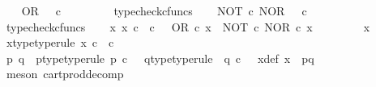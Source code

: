 \begin{isabellebody}
\ \ \isamarkupfalse%
\ {\isachardoublequoteopen}OR\ {\isacharcolon}{\kern0pt}\ {\isasymOmega}\ {\isasymtimes}\isactrlsub c\ {\isasymOmega}\ {\isasymrightarrow}\ {\isasymOmega}{\isachardoublequoteclose}\isanewline
\ \ \ \ \isamarkupfalse%
\ typecheck{\isacharunderscore}{\kern0pt}cfuncs\isanewline
\ \ \isamarkupfalse%
\ {\isachardoublequoteopen}NOT\ {\isasymcirc}\isactrlsub c\ NOR\ {\isacharcolon}{\kern0pt}\ {\isasymOmega}\ {\isasymtimes}\isactrlsub c\ {\isasymOmega}\ {\isasymrightarrow}\ {\isasymOmega}{\isachardoublequoteclose}\isanewline
\ \ \ \ \isamarkupfalse%
\ typecheck{\isacharunderscore}{\kern0pt}cfuncs\isanewline
\ \ \isamarkupfalse%
\ {\isachardoublequoteopen}{\isasymAnd}x{\isachardot}{\kern0pt}\ x\ {\isasymin}\isactrlsub c\ {\isasymOmega}\ {\isasymtimes}\isactrlsub c\ {\isasymOmega}\ {\isasymLongrightarrow}\ OR\ {\isasymcirc}\isactrlsub c\ x\ {\isacharequal}{\kern0pt}\ {\isacharparenleft}{\kern0pt}NOT\ {\isasymcirc}\isactrlsub c\ NOR{\isacharparenright}{\kern0pt}\ {\isasymcirc}\isactrlsub c\ x{\isachardoublequoteclose}\isanewline
\ \ \isamarkupfalse%
{\isacharminus}{\kern0pt}\isanewline
\ \ \ \ \isamarkupfalse%
\ x\ \isanewline
\ \ \ \ \isamarkupfalse%
\ x{\isacharunderscore}{\kern0pt}type{\isacharbrackleft}{\kern0pt}type{\isacharunderscore}{\kern0pt}rule{\isacharbrackright}{\kern0pt}{\isacharcolon}{\kern0pt}\ {\isachardoublequoteopen}x\ {\isasymin}\isactrlsub c\ {\isasymOmega}\ {\isasymtimes}\isactrlsub c\ {\isasymOmega}{\isachardoublequoteclose}\isanewline
\ \ \ \ \isamarkupfalse%
\ \isamarkupfalse%
\ p\ q\ \ p{\isacharunderscore}{\kern0pt}type{\isacharbrackleft}{\kern0pt}type{\isacharunderscore}{\kern0pt}rule{\isacharbrackright}{\kern0pt}{\isacharcolon}{\kern0pt}\ {\isachardoublequoteopen}p\ {\isasymin}\isactrlsub c\ {\isasymOmega}{\isachardoublequoteclose}\ \ q{\isacharunderscore}{\kern0pt}type{\isacharbrackleft}{\kern0pt}type{\isacharunderscore}{\kern0pt}rule{\isacharbrackright}{\kern0pt}{\isacharcolon}{\kern0pt}\ \ {\isachardoublequoteopen}q\ {\isasymin}\isactrlsub c\ {\isasymOmega}{\isachardoublequoteclose}\ \ x{\isacharunderscore}{\kern0pt}def{\isacharcolon}{\kern0pt}\ {\isachardoublequoteopen}x\ {\isacharequal}{\kern0pt}\ {\isasymlangle}p{\isacharcomma}{\kern0pt}q{\isasymrangle}{\isachardoublequoteclose}\isanewline
\ \ \ \ \ \ \isamarkupfalse%
\ {\isacharparenleft}{\kern0pt}meson\ cart{\isacharunderscore}{\kern0pt}prod{\isacharunderscore}{\kern0pt}decomp{\isacharparenright}{\kern0pt}\isanewline

\end{isabellebody}
